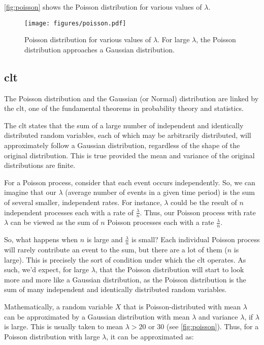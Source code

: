 \autoref{fig:poisson} shows the Poisson distribution for various values of $\lambda$.

\begin{figure}[htb]
    \centering
    \texttt{[image: figures/poisson.pdf]}
    \caption{Poisson distribution for various values of $\lambda$. For large $\lambda$, the Poisson distribution
        approaches a Gaussian distribution.}
    \label{fig:poisson}
\end{figure}

\subsection{\gls{clt}}

The Poisson distribution and the Gaussian (or Normal) distribution are linked by the \gls{clt}, one of the
fundamental theorems in probability theory and statistics.

The \gls{clt} states that the sum of a large number of independent and identically distributed random
variables, each of which may be arbitrarily distributed, will approximately follow a Gaussian distribution, regardless
of the shape of the original distribution. This is true provided the mean and variance of the original distributions are
finite.

For a Poisson process, consider that each event occurs independently. So, we can imagine that our $\lambda$ (average
number of events in a given time period) is the sum of several smaller, independent rates. For instance, $\lambda$ could
be the result of $n$ independent processes each with a rate of $\frac{\lambda}{n}$. Thus, our Poisson process with rate
$\lambda$ can be viewed as the sum of $n$ Poisson processes each with a rate $\frac{\lambda}{n}$.

So, what happens when $n$ is large and $\frac{\lambda}{n}$ is small? Each individual Poisson process will rarely
contribute an event to the sum, but there are a lot of them ($n$ is large). This is precisely the sort of condition
under which the \gls{clt} operates. As such, we'd expect, for large $\lambda$, that the Poisson distribution
will start to look more and more like a Gaussian distribution, as the Poisson distribution is the sum of many
independent and identically distributed random variables.

Mathematically, a random variable $X$ that is Poisson-distributed with mean $\lambda$ can be approximated by a Gaussian
distribution with mean $\lambda$ and variance $\lambda$, if $\lambda$ is large. This is usually taken to mean $\lambda >
    20$ or $30$ (see \autoref{fig:poisson}). Thus, for a Poisson distribution with large $\lambda$, it can be approximated as:

